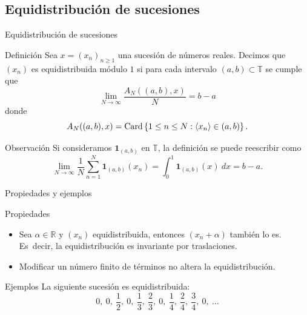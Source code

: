 \subsection{Equidistribución de sucesiones}
\begin{frame}{Equidistribución de sucesiones}

\begin{block}{Definición}
Sea $x=(x_n)_{n\geq1}$ una sucesión de números reales. 
Decimos que $(x_n)$ es equidistribuida módulo $1$ si para cada
intervalo $(a,b) \subset \mathbb{T}$ se cumple que
\[
\label{def:equidistribucion}
\lim_{N\to\infty} \frac{A_N((a,b), x)}{N} = b-a
\]
donde 
\[
A_N((a,b), x) = 
\operatorname{Card} \left\{1\le n\le N : \langle x_n \rangle \in (a,b)\right\}.
\]
\end{block}

\pause

\begin{exampleblock}{Observación}
Si consideramos $\mathbf{1}_{(a,b)}$ en $\mathbb{T}$, la
definición se puede reescribir como
\[
\lim_{N\to\infty} \frac{1}{N} \sum_{n=1}^N \mathbf{1}_{(a,b)}(x_n) =
\int_0^1 \mathbf{1}_{(a,b)}(x)\ dx = 
b-a.
\]
\end{exampleblock}

\end{frame}


\begin{frame}{Propiedades y ejemplos}

\begin{block}{Propiedades}
\begin{itemize}
\item Sea $\alpha \in \mathbb{R}$ y $(x_n)$ equidistribuida, entonces $(x_n+\alpha)$ también lo es.
Es~decir, la equidistribución es invariante por traslaciones.
\vspace{0.2cm}
\item Modificar un número finito de términos no altera la equidistribución.
\end{itemize}
\end{block}

\vspace{0.2cm}
\pause

\begin{exampleblock}{Ejemplos}
La siguiente sucesión es equidistribuida:
\[
0, \ 
0, \ \frac{1}{2}, \ 
0, \ \frac{1}{3}, \ \frac{2}{3}, \ 
0, \ \frac{1}{4}, \ \frac{2}{4}, \ \frac{3}{4}, \ 
0, \ \dots 
\]
\end{exampleblock}

\end{frame}


